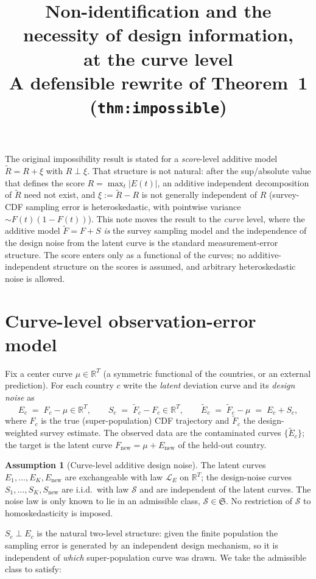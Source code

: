 \documentclass[12pt]{article}
\title{Non-identification and the necessity of design information,\\ at the curve level\\
\large A defensible rewrite of Theorem~1 (\texttt{thm:impossible})}
\date{}
\theoremstyle{definition}
\newtheorem{assumption}{Assumption}
\theoremstyle{remark}
\newcommand{\Fnew}{F_{\mathrm{new}}}
\newcommand{\Enew}{E_{\mathrm{new}}}
\newcommand{\Snew}{S_{\mathrm{new}}}
\newcommand{\law}{\mathcal L}
\begin{document}
\maketitle

The original impossibility result is stated for a \emph{score}-level additive model
$\widetilde R=R+\xi$ with $R\perp\xi$. That structure is not natural: after the sup/absolute
value that defines the score $R=\max_t|E(t)|$, an additive independent decomposition of
$\widetilde R$ need not exist, and $\xi:=\widetilde R-R$ is not generally independent of $R$
(survey-CDF sampling error is heteroskedastic, with pointwise variance $\sim F(t)(1-F(t))$).
This note moves the result to the \emph{curve} level, where the additive model
$\widetilde F=F+S$ \emph{is} the survey sampling model and the independence of the design
noise from the latent curve is the standard measurement-error structure. The score enters
only as a functional of the curves; no additive-independent structure on the scores is
assumed, and arbitrary heteroskedastic noise is allowed.

\section*{Curve-level observation-error model}

Fix a center curve $\mu\in\mathbb R^{T}$ (a symmetric functional of the countries, or an
external prediction). For each country $c$ write the \emph{latent} deviation curve and its
\emph{design noise} as
\[
  E_c \;=\; F_c-\mu\in\mathbb R^{T},\qquad
  S_c \;=\; \widetilde F_c - F_c\in\mathbb R^{T},\qquad
  \widetilde E_c \;=\; \widetilde F_c-\mu \;=\; E_c+S_c,
\]
where $F_c$ is the true (super-population) CDF trajectory and $\widetilde F_c$ the
design-weighted survey estimate. The observed data are the contaminated curves
$\{\widetilde E_c\}$; the target is the latent curve $\Fnew=\mu+\Enew$ of the held-out
country.

\begin{assumption}[Curve-level additive design noise]\label{ass:model}
The latent curves $E_1,\dots,E_K,\Enew$ are exchangeable with law $\law_E$ on $\mathbb R^{T}$;
the design-noise curves $S_1,\dots,S_K,\Snew$ are i.i.d.\ with law $\mathcal S$ and are
independent of the latent curves. The noise law is only known to lie in an admissible class,
$\mathcal S\in\mathfrak S$. No restriction of $\mathcal S$ to homoskedasticity is imposed.
\end{assumption}

\noindent
$S_c\perp E_c$ is the natural two-level structure: given the finite population the sampling
error is generated by an independent design mechanism, so it is independent of \emph{which}
super-population curve was drawn. We take the admissible class to satisfy:
\end{document}
